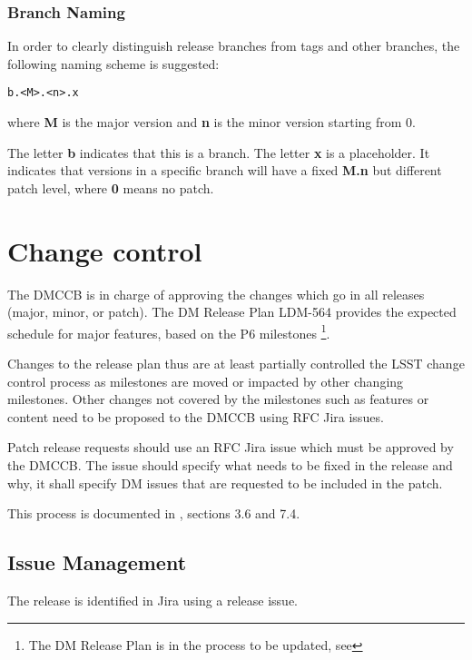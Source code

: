 \subsubsection{Branch Naming} \label{sec:branchnaming}

In order to clearly distinguish release branches from tags and other branches, the following naming scheme is suggested:

\begin{verbatim}
b.<M>.<n>.x
\end{verbatim}

where \textbf{M} is the major version and \textbf{n} is the minor version starting from 0.

The letter  \textbf{b} indicates that this is a branch.
The letter \textbf{x} is a placeholder. It indicates that versions in a specific branch will have a fixed \textbf{M.n} but different patch level, where \textbf{0} means no patch.


\newpage
\section{Change control} \label{sec:changecontrol}

The DMCCB is in charge of approving the changes which go in  all releases (major, minor, or patch).
The DM Release Plan LDM-564 provides the expected schedule for major features, based on the P6 milestones \footnote{The DM Release Plan is in the process to be updated, see }.

Changes to the release plan  thus are  at least partially controlled the LSST change control  process as  milestones are moved or impacted by other changing milestones. Other changes not covered by the milestones such as features or content need to be proposed to the DMCCB using RFC Jira issues.

Patch release requests should use an RFC Jira issue which must be approved by the DMCCB.
The issue should specify what needs to be fixed in the release and why, it shall specify DM issues that are requested to be included in the patch.

This process is documented in , sections 3.6 and 7.4.


\subsection{Issue Management} \label{sec:issues}

The release is identified in Jira using a release issue.


